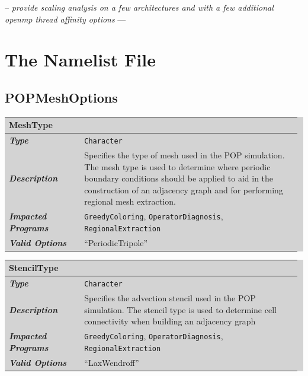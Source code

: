 \documentclass{softwaremanual}
\begin{document}
-- \textit{ provide scaling analysis on a few architectures and with a few additional openmp thread affinity options } ---

\section{The Namelist File}

\subsection{POPMeshOptions} \label{sec:POPMeshOptions}

\begingroup\setlength{\fboxsep}{0pt}
  \colorbox{lightgray}{
    \begin{tabular}{p{0.25\linewidth} p{0.725\linewidth}}
    \toprule
    \textbf{MeshType} & \\
    \midrule
    \textbf{\textit{Type}} & \texttt{Character} \\
    \midrule
    \textbf{\textit{Description}} & Specifies the type of mesh used in the POP simulation. The mesh type is used to determine where periodic boundary conditions should be applied to aid in the construction of an adjacency graph and for performing regional mesh extraction. \\
    \midrule
    \textbf{\textit{Impacted Programs}} & \texttt{GreedyColoring}, \texttt{OperatorDiagnosis}, \texttt{RegionalExtraction} \\
    \midrule
    \textbf{\textit{Valid Options}}  & ``PeriodicTripole'' \\
    \bottomrule
\end{tabular}
}\endgroup


\noindent\begingroup\setlength{\fboxsep}{0pt}
\colorbox{lightgray}{
\begin{tabular}{p{0.25\linewidth} p{0.725\linewidth}}
\toprule
\textbf{StencilType} & \\
\midrule
\textbf{\textit{Type}} & \texttt{Character} \\
\midrule
\textbf{\textit{Description}} & Specifies the advection stencil used in the POP simulation. The stencil type is used to determine cell connectivity when building an adjacency graph  \\
\midrule
\textbf{\textit{Impacted Programs}} & \texttt{GreedyColoring}, \texttt{OperatorDiagnosis}, \texttt{RegionalExtraction} \\
\midrule
\textbf{\textit{Valid Options}}  & ``LaxWendroff'' \\
\bottomrule
\end{tabular}
}\endgroup
\end{document}
